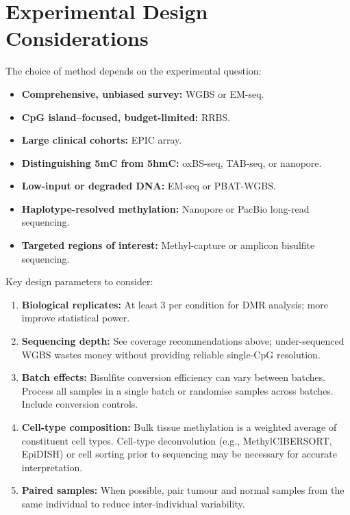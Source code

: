\section{Experimental Design Considerations}
\label{sec:methylation:design}

\begin{keyconcept}[title={Choosing a Methylation Method}]
The choice of method depends on the experimental question:
\begin{itemize}[itemsep=2pt]
  \item \textbf{Comprehensive, unbiased survey:} WGBS or EM-seq.
  \item \textbf{CpG island--focused, budget-limited:} RRBS.
  \item \textbf{Large clinical cohorts:} EPIC array.
  \item \textbf{Distinguishing 5mC from 5hmC:} oxBS-seq, TAB-seq, or nanopore.
  \item \textbf{Low-input or degraded DNA:} EM-seq or PBAT-WGBS.
  \item \textbf{Haplotype-resolved methylation:} Nanopore or PacBio long-read sequencing.
  \item \textbf{Targeted regions of interest:} Methyl-capture or amplicon bisulfite sequencing.
\end{itemize}
\end{keyconcept}

Key design parameters to consider:

\begin{enumerate}[itemsep=3pt]
  \item \textbf{Biological replicates:} At least 3 per condition for DMR analysis; more improve statistical power.
  \item \textbf{Sequencing depth:} See coverage recommendations above; under-sequenced WGBS wastes money without providing reliable single-CpG resolution.
  \item \textbf{Batch effects:} Bisulfite conversion efficiency can vary between batches. Process all samples in a single batch or randomise samples across batches. Include conversion controls.
  \item \textbf{Cell-type composition:} Bulk tissue methylation is a weighted average of constituent cell types. Cell-type deconvolution (e.g., MethylCIBERSORT, EpiDISH) or cell sorting prior to sequencing may be necessary for accurate interpretation.
  \item \textbf{Paired samples:} When possible, pair tumour and normal samples from the same individual to reduce inter-individual variability.
\end{enumerate}

